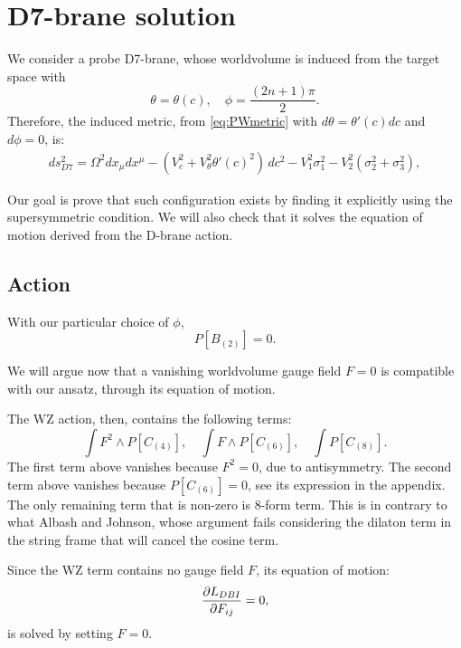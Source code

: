 \section{D7-brane solution}

We consider a probe D7-brane, whose worldvolume is induced from the target space with 
\begin{equation}
 \theta = \theta(c), \quad \phi=\frac{(2 n + 1)\pi}{2}.
\end{equation}
Therefore, the induced metric, from \eqref{eq:PWmetric} with $d\theta = \theta'(c) dc$ and $d\phi=0$, is:
\begin{align}\label{eq:PWmetric}
ds_{D7}^2 =
\Omega^2 dx_\mu dx^\mu 
- (V_c^2 +V_\theta^2 \theta'(c)^2)\, dc^2 - V_1^2 \sigma_1^2 - V_2^2 (\sigma_2^2 + \sigma_3^2),
\end{align}

Our goal is prove that such configuration exists by finding it explicitly using the supersymmetric condition. 
We will also check that it solves the equation of motion derived from the D-brane action.

\subsection{Action}


With our particular choice of $\phi$, 
\begin{equation}
 P[B_{(2)}] = 0.
\end{equation}

We will argue now that a vanishing worldvolume gauge field $F=0$ is compatible with our ansatz, through its equation of motion.

The WZ action, then, contains the following terms:
\begin{equation}
 \int F^2 \wedge P[C_{(4)}], \quad \int F\wedge P[C_{(6)}], \quad \int P[C_{(8)}].
\end{equation}
The first term above vanishes because $F^2=0$, due to antisymmetry. The second term above vanishes because $P[C_{(6)}]=0$, see its expression in the appendix. The only remaining term that is non-zero is 8-form term. 
This is in contrary to what Albash and Johnson, whose argument fails considering the dilaton term in the string frame that will cancel the cosine term.

Since the WZ term contains no gauge field $F$, its equation of motion:
\begin{equation}
 \dfrac{\partial L_{DBI}}{\partial F_{ij}} = 0,
\end{equation}
is solved by setting $F=0$. 

